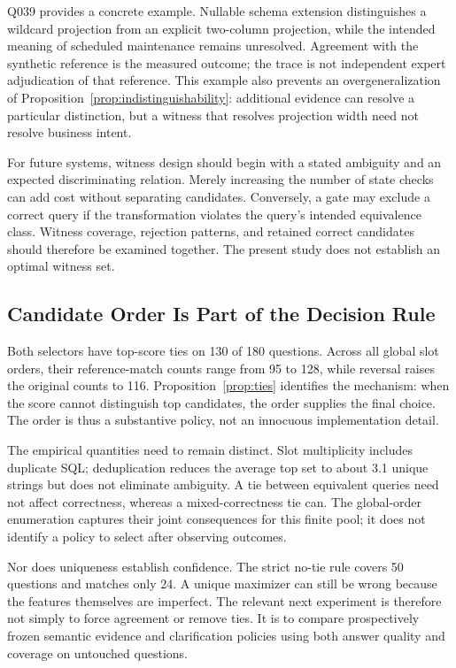 \documentclass[information,article,submit,moreauthors]{Definitions/mdpi}
\begin{document}
Q039 provides a concrete example. Nullable schema extension distinguishes a wildcard projection from an explicit two-column projection, while the intended meaning of scheduled maintenance remains unresolved. Agreement with the synthetic reference is the measured outcome; the trace is not independent expert adjudication of that reference. This example also prevents an overgeneralization of Proposition~\ref{prop:indistinguishability}: additional evidence can resolve a particular distinction, but a witness that resolves projection width need not resolve business intent.

For future systems, witness design should begin with a stated ambiguity and an expected discriminating relation. Merely increasing the number of state checks can add cost without separating candidates. Conversely, a gate may exclude a correct query if the transformation violates the query's intended equivalence class. Witness coverage, rejection patterns, and retained correct candidates should therefore be examined together. The present study does not establish an optimal witness set.

\subsection{Candidate Order Is Part of the Decision Rule}

Both selectors have top-score ties on 130 of 180 questions. Across all global slot orders, their reference-match counts range from 95 to 128, while reversal raises the original counts to 116. Proposition~\ref{prop:ties} identifies the mechanism: when the score cannot distinguish top candidates, the order supplies the final choice. The order is thus a substantive policy, not an innocuous implementation detail.

The empirical quantities need to remain distinct. Slot multiplicity includes duplicate SQL; deduplication reduces the average top set to about 3.1 unique strings but does not eliminate ambiguity. A tie between equivalent queries need not affect correctness, whereas a mixed-correctness tie can. The global-order enumeration captures their joint consequences for this finite pool; it does not identify a policy to select after observing outcomes.

Nor does uniqueness establish confidence. The strict no-tie rule covers 50 questions and matches only 24. A unique maximizer can still be wrong because the features themselves are imperfect. The relevant next experiment is therefore not simply to force agreement or remove ties. It is to compare prospectively frozen semantic evidence and clarification policies using both answer quality and coverage on untouched questions.
\end{document}
